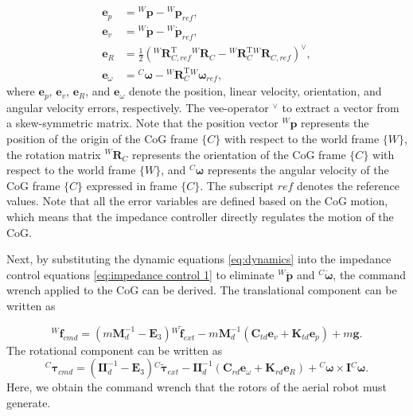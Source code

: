 \begin{subequations}
\label{eq:error of rotation}
\begin{align}
    {\boldsymbol{e}_p}&={^W\!\boldsymbol{p}}-{^W\!\boldsymbol{p}_{ref}}, \\[2pt]
    {\boldsymbol{e}_v}&={^W\!\dot{\boldsymbol{p}}}-{^W\!\dot{\boldsymbol{p}}_{ref}}, \\[2pt]
    {\boldsymbol{e}_R}&=\frac{1}{2}({^W\!\boldsymbol{R}^{\mathrm{T}}_{C,ref}}{^W\!\boldsymbol{R}_{C}}-{^W\!\boldsymbol{R}^{\mathrm{T}}_{C}}{^W\!\boldsymbol{R}_{C,ref}})^\vee, \\[2pt]
    {\boldsymbol{e}_\omega}&={^C\!\boldsymbol{\omega}}-{^W\!\boldsymbol{R}^{\mathrm{T}}_{C}}{^W\!\boldsymbol{\omega}}_{ref},
\end{align}
\end{subequations}
where $\boldsymbol{e}_p$, $\boldsymbol{e}_v$, $\boldsymbol{e}_R$, and $\boldsymbol{e}_\omega$ denote the position, linear velocity, orientation, and angular velocity errors, respectively. The vee-operator $^\vee$ to extract a vector from a skew-symmetric matrix. Note that the position vector $^W\!\boldsymbol{p}$ represents the position of the origin of the CoG frame $\{C\}$ with respect to the world frame $\{W\}$, the rotation matrix $^W\!\boldsymbol{R}_{C}$ represents the orientation of the CoG frame $\{C\}$ with respect to the world frame $\{W\}$, and $^C\!\boldsymbol{\omega}$ represents the angular velocity of the CoG frame $\{C\}$ expressed in frame $\{C\}$. The subscript $ref$ denotes the reference values. Note that all the error variables are defined based on the CoG motion, which means that the impedance controller directly regulates the motion of the CoG.

Next, by substituting the dynamic equations \eqref{eq:dynamics} into the impedance control equations \eqref{eq:impedance control 1} to eliminate $^W\ddot{\boldsymbol{p}}$ and $^C\dot{\boldsymbol{\omega}}$, the command wrench applied to the CoG can be derived. The translational component can be written as

\begin{equation}
\label{eq:imp cmd for trans1}
    {^W\!\boldsymbol{f}_{cmd}}=(m\boldsymbol{M}^{-1}_d-\boldsymbol{E}_3){^W\!\boldsymbol{\tilde{f}}_{ext}}-m\boldsymbol{M}_d^{-1}({\boldsymbol{C}_{td}}{\boldsymbol{e}_v}+{\boldsymbol{K}_{td}}{\boldsymbol{e}_p})+m\boldsymbol{g}.
\end{equation}
The rotational component can be written as
\begin{equation}
\label{eq:imp cmd for rot1}
    {^{C}\boldsymbol{\tau}_{cmd}}=(\boldsymbol{I}\boldsymbol{I}^{-1}_d-\boldsymbol{E}_3){^{C}}\boldsymbol{\tilde{\tau}}_{ext}-\boldsymbol{I}\boldsymbol{I}^{-1}_d({\boldsymbol{C}_{rd}}{\boldsymbol{e}_\omega}+{\boldsymbol{K}_{rd}}{\boldsymbol{e}_R})+{^{C}\boldsymbol{\omega}} \times \boldsymbol{I}{^{C}\boldsymbol{\omega}}.
\end{equation}
Here, we obtain the command wrench that the rotors of the aerial robot must generate.

